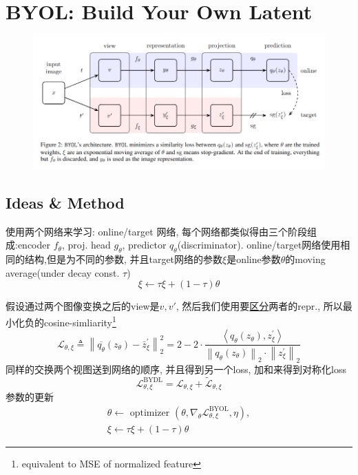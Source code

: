 \documentclass{article}
\begin{document}
\section{BYOL: Build Your Own Latent}
\begin{figure}[htbp]
    \centering
    \includegraphics[width=\textwidth]{byol-fig.png}
\end{figure}
\subsection{Ideas \& Method}

使用两个网络来学习: online/target 网络, 每个网络都类似得由三个阶段组成:encoder $f_\theta$, proj. head $g_\theta$, predictor $q_\theta$(discriminator). online/target网络使用相同的结构,但是为不同的参数, 并且target网络的参数$\xi$是online参数$\theta$的moving average(under decay const. $\tau$)
\begin{equation}
    \xi \leftarrow \tau \xi+(1-\tau) \theta
\end{equation}

假设通过两个图像变换之后的view是$v,v'$, 然后我们使用要\underline{区分}两者的repr., 所以最小化负的cosine-simliarity\footnote{equivalent to MSE of normalized feature}
\begin{equation}
    \mathcal{L}_{\theta, \xi} \triangleq\left\|\overline{q_{\theta}}\left(z_{\theta}\right)-\bar{z}_{\xi}^{\prime}\right\|_{2}^{2}=2-2 \cdot \frac{\left\langle q_{\theta}\left(z_{\theta}\right), z_{\xi}^{\prime}\right\rangle}{\left\|q_{\theta}\left(z_{\theta}\right)\right\|_{2} \cdot\left\|z_{\xi}^{\prime}\right\|_{2}}
\end{equation}
同样的交换两个视图送到网络的顺序, 并且得到另一个loss, 加和来得到对称化loss
\begin{equation}
    \mathcal{L}_{\theta, \xi}^{\mathrm{BYDL}}=\mathcal{L}_{\theta, \xi}+\widetilde{\mathcal{L}}_{\theta, \xi}
\end{equation}
参数的更新
\begin{equation}
    \begin{array}{l}
    \theta \leftarrow \text { optimizer }\left(\theta, \nabla_{\theta} \mathcal{L}_{\theta, \xi}^{\mathrm{BYOL}}, \eta\right), \\
    \xi \leftarrow \tau \xi+(1-\tau) \theta
    \end{array}
\end{equation}
\end{document}

